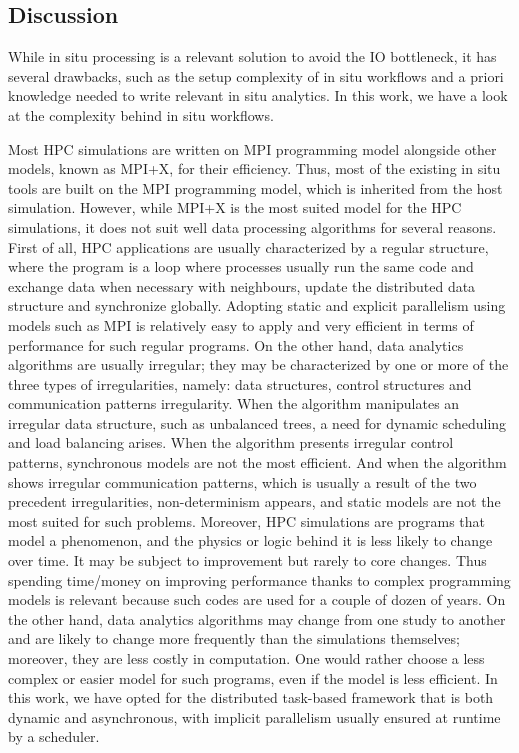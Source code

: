 \subsection{Discussion}\label{sec:discussion:programmingmodels}

While in situ processing is a relevant solution to avoid the IO bottleneck, it has several drawbacks, such as the setup complexity of in situ workflows and a priori knowledge needed to write relevant in situ analytics. In this work, we  have a look at the complexity behind in situ workflows.  

Most HPC simulations are written on MPI programming model alongside other models, known as MPI+X, for their efficiency. Thus, most of the existing in situ tools are built on the MPI programming model, which is inherited from the host simulation. However, while MPI+X is the most suited model for the HPC simulations, it does not suit well data processing algorithms for several reasons.
First of all, HPC applications are usually characterized by a regular structure, where the program is a loop where processes usually run the same code and exchange data when necessary with neighbours, update the distributed data structure and synchronize globally. Adopting static and explicit parallelism using models such as MPI is relatively easy to apply and very efficient in terms of performance for such regular programs. 
On the other hand, data analytics algorithms are usually irregular; they may be characterized by one or more of the three types of irregularities, namely: data structures, control structures and communication patterns irregularity\cite{4919639}. When the algorithm manipulates an irregular data structure, such as unbalanced trees, a need for dynamic scheduling and load balancing arises. When the algorithm presents irregular control patterns, synchronous models are not the most efficient. And when the algorithm shows irregular communication patterns, which is usually a result of the two precedent irregularities, non-determinism appears, and static models are not the most suited for such problems. 
Moreover, HPC simulations are programs that model a phenomenon, and the physics or logic behind it is less likely to change over time. It may be subject to improvement but rarely to core changes. Thus spending time/money on improving performance thanks to complex programming models is relevant because such codes are used for a couple of dozen of years.   
On the other hand, data analytics algorithms may change from one study to another and are likely to change more frequently than the simulations themselves; moreover, they are less costly in computation. One would rather choose a less complex or easier model for such programs, even if the model is less efficient. In this work, we have opted for the distributed task-based framework that is both dynamic and asynchronous, with implicit parallelism usually ensured at runtime by a scheduler.   

